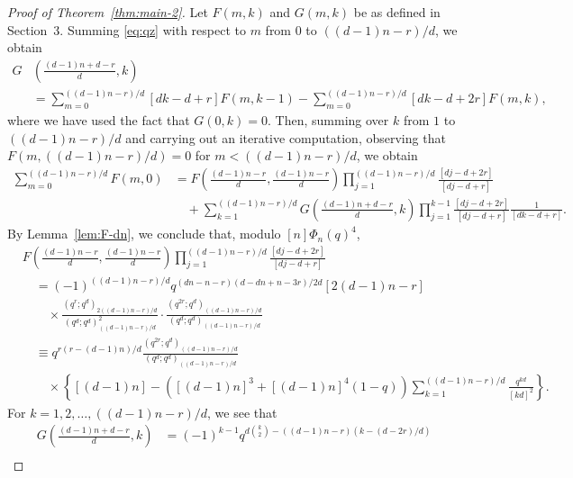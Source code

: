 \documentclass[10pt,a4paper]{amsart}
\begin{document}
\begin{proof}[Proof of Theorem~\ref{thm:main-2}]
Let \(F(m,k)\) and \(G(m,k)\) be as defined in Section~3.
Summing \eqref{eq:qz} with respect to \(m\) from \(0\) to \(((d-1)n-r)/d\), we obtain
\begin{align*}
    G&\left(\frac{(d-1)n+d-r}{d},k\right)\\
    &=\sum_{m=0}^{((d-1)n-r)/d}[dk-d+r]F(m,k-1)-\sum_{m=0}^{((d-1)n-r)/d}[dk-d+2r]F(m,k),
\end{align*}
where we have used the fact that $G(0,k)=0$.
Then, summing over $k$ from $1$ to $((d-1)n-r)/d$ and carrying out an iterative computation,
 observing that $F(m,((d-1)n-r)/d)=0$ for $m<((d-1)n-r)/d$, we obtain
\begin{align}\label{eq:FG-dn}
    \sum_{m=0}^{((d-1)n-r)/d}F(m,0)
    &=F\left(\frac{(d-1)n-r}{d},\frac{(d-1)n-r}{d}\right)\prod_{j=1}^{((d-1)n-r)/d}\frac{[dj-d+2r]}{[dj-d+r]}\nonumber\\
    &\hspace{1em}+\sum_{k=1}^{((d-1)n-r)/d}G\left(\frac{(d-1)n+d-r}{d},k\right)\prod_{j=1}^{k-1}\frac{[dj-d+2r]}{[dj-d+r]}\frac{1}{[dk-d+r]}.
\end{align}
By Lemma~\ref{lem:F-dn}, we conclude that, modulo $[n]\Phi_n(q)^4$,
\begin{align}\label{eq:F-dn-final}
    &F\left(\frac{(d-1)n-r}{d},\frac{(d-1)n-r}{d}\right)\prod_{j=1}^{((d-1)n-r)/d}\frac{[dj-d+2r]}{[dj-d+r]}\nonumber\\
    &\hspace{1em}=(-1)^{((d-1)n-r)/d}q^{(dn-n-r)(d-dn+n-3r)/2d}[2(d-1)n-r]\nonumber\\
    &\hspace{2em}\times\frac{(q^r;q^d)_{2((d-1)n-r)/d}}{(q^d;q^d)^2_{((d-1)n-r)/d}}\cdot
    \frac{(q^{2r};q^d)_{((d-1)n-r)/d}}{(q^d;q^d)_{((d-1)n-r)/d}}\nonumber\\
    &\hspace{1em}\equiv q^{r(r-(d-1)n)/d}\frac{(q^{2r};q^d)_{((d-1)n-r)/d}}{(q^d;q^d)_{((d-1)n-r)/d}}\nonumber\\
    &\hspace{2em}\times\left\{[(d-1)n]-([(d-1)n]^3+[(d-1)n]^4(1-q))
    \sum_{k=1}^{((d-1)n-r)/d}\frac{q^{kd}}{[kd]^2}\right\}.
\end{align}
For $k=1,2,\dots,((d-1)n-r)/d$, we see that 
\begin{align}\label{eq:G-dn}
    G\left(\frac{(d-1)n+d-r}{d},k\right)&=(-1)^{k-1}q^{d\binom{k}{2}-((d-1)n-r)(k-(d-2r)/d)}\nonumber\\

\end{align}
\end{proof}
\end{document}
